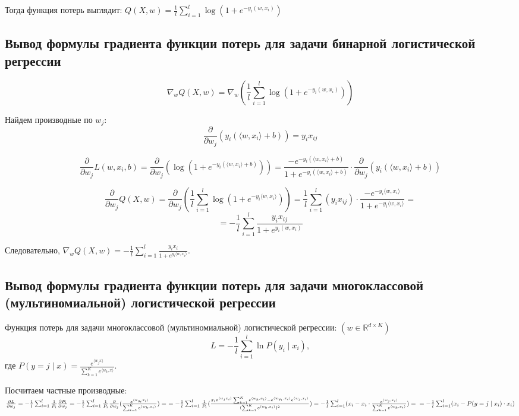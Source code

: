 \documentclass[14pt]{extarticle}
\begin{document}
Тогда функция потерь выглядит: $Q(X, w) = \frac{1}{l} \sum_{i=1}^l \log\left(1 + e^{-y_i (w, x_i)}\right)$

\subsection{Вывод формулы градиента функции потерь для задачи бинарной логистической регрессии}
\[
\nabla_{w} Q(X, w) = \nabla_{w} \left( \frac{1}{l} \sum_{i=1}^l \log\left(1 + e^{-y_i (w,x_i)}\right) \right)
\]

Найдем производные по $w_j$:
\[
  \frac{\partial}{\partial w_j} (y_i (\langle w, x_i \rangle + b)) = y_i x_{ij}
\]

\[
\frac{\partial}{\partial w_j} L(w, x_i, b) = \frac{\partial}{\partial w_j} \left( \log \left( 1 + e^{-y_i (\langle w, x_i \rangle + b)} \right) \right) 
= \frac{-e^{-y_i (\langle w, x_i \rangle + b)}}{1 + e^{-y_i (\langle w, x_i \rangle + b)}} \cdot \frac{\partial}{\partial w_j} (y_i (\langle w, x_i \rangle + b))
\]

\[
\frac{\partial}{\partial w_j} Q(X, w) = \frac{\partial}{\partial w_j} \left( \frac{1}{l} \sum_{i=1}^l \log \left( 1 + e^{-y_i \langle w, x_i \rangle} \right) \right) = \frac{1}{l} \sum_{i=1}^l \left( y_i x_{ij} \right) \cdot \frac{-e^{-y_i \langle w, x_i \rangle}}{1 + e^{-y_i \langle w, x_i \rangle}} = \]
\[ 
= -\frac{1}{l} \sum_{i=1}^l \frac{y_i x_{ij}}{1 + e^{y_i (w, x_i)}}
\]

Следовательно, $\nabla_{w} Q(X, w) = -\frac{1}{l} \sum_{i=1}^l \frac{y_i x_i}{1 + e^{y_i \langle w, x_i \rangle}} $.

\subsection{Вывод формулы градиента функции потерь для задачи многоклассовой (мультиномиальной) логистической регрессии}

Функция потерь для задачи многоклассовой (мультиномиальной) логистической регрессии: \((w \in \mathbb{R}^{d \times K})\)
\[
L = -\frac{1}{l} \sum_{i=1}^l \ln P(y_i \mid x_i),
\]
где
$
P(y = j \mid x) = \frac{e^{\langle w_j x \rangle}}{\sum_{k=1}^K e^{ \langle w_k, x \rangle}}.
$

Посчитаем частные производные: $  \frac{\partial L}{\partial w_j} = -\frac{1}{l} \sum_{i=1}^l \frac{1}{P_i} \frac{\partial P_i}{\partial w_j} = -\frac{1}{l} \sum_{i=1}^l \frac{1}{P_i} \frac{\partial}{\partial w_j}(\frac{e^{\langle w_{y_i} x_i \rangle}}{\sum_{k=1}^K e^{ \langle w_k, x_i \rangle}}) = \ = -\frac{1}{l} \sum_{i=1}^l \frac{1}{P_i} (\frac{x_i e^{\langle w_j x_i \rangle} \sum_{k=1}^K e^{ \langle w_k, x_i \rangle} - e^{ \langle w_{y_i}, x_i \rangle} e^{ \langle w_j, x_i \rangle}} {(\sum_{k=1}^K e^{ \langle w_k, x_i \rangle})^2}) = -\frac{1}{l} \sum_{i=1}^l (x_i - x_i \cdot \frac{e^{ \langle w_j, x_i \rangle}}{\sum_{k=1}^K e^{ \langle w_k, x_i \rangle}}) = \\ = -\frac{1}{l} \sum_{i=1}^l (x_i - P(y = j \mid x_i) \cdot x_i)
$
\end{document}
